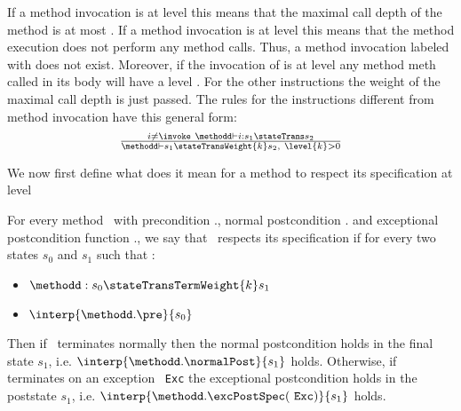 If a method invocation is at level  this means that the maximal call depth of the method is at most  .
If a method invocation is at level  this means that the method execution does not perform any method calls.
Thus, a method invocation labeled with  does not exist. Moreover, if the invocation of  \methodd{}
 is at level  any method \mbox{\rm meth}  called in its body will have a level . 
 For the other instructions the weight of the maximal call depth is just passed. The rules for the instructions different from 
method invocation have this general form: 
$$ \begin{array}{l}
              \frac{ i \neq \invoke \  \methodd \vdash  i: s_1 \stateTrans s_2 }{ \methodd \vdash s_1 \stateTransWeight{k} s_2 , \  \level{k} > 0}
\end{array}$$
 
We now first define what does it mean for a method to respect its specification at level 
\begin{defCorrect} \label{defCorrectLevel}
For every method \methodd \ with precondition \methodd.\pre, normal postcondition \methodd.\normalPost
and exceptional postcondition function \methodd.\excPostSpec, we say that \methodd \ respects its specification if 
for every two states $s_0$ and $s_1$ such that :
\begin{itemize}
      
      \item   $\methodd : s_0  \stateTransTermWeight{k} s_1   $
      \item   $ \interp{\methodd.\pre }{ s_0 }$
\end{itemize}
Then if \methodd \ terminates normally then the normal postcondition holds in the final state $s_1 $, i.e.  $\interp{\methodd.\normalPost}{s_1}$ holds. 
Otherwise, if  \methodd{}  terminates on an exception \mbox{ \rm \texttt{Exc}} the exceptional postcondition holds in the poststate $s_1 $, i.e.
$ \interp{\methodd.\excPostSpec(  \mbox{ \rm \texttt{Exc}} )}{s_1} $ holds.
\end{defCorrect}

